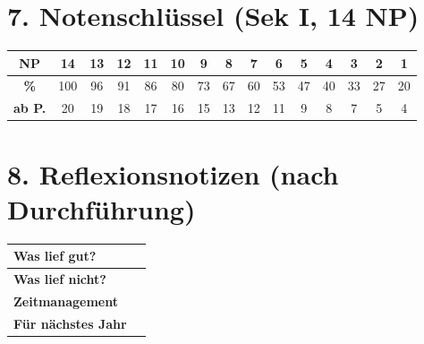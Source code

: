 \documentclass[11pt, a4paper]{article}
\begin{document}

\section*{7. Notenschlüssel (Sek I, 14 NP)}

\begin{tabular}{|c|c|c|c|c|c|c|c|c|c|c|c|c|c|c|}
\hline
\textbf{NP} & 14 & 13 & 12 & 11 & 10 & 9 & 8 & 7 & 6 & 5 & 4 & 3 & 2 & 1 \\
\hline
\textbf{\%} & 100 & 96 & 91 & 86 & 80 & 73 & 67 & 60 & 53 & 47 & 40 & 33 & 27 & 20 \\
\hline
\textbf{ab P.} & 20 & 19 & 18 & 17 & 16 & 15 & 13 & 12 & 11 & 9 & 8 & 7 & 5 & 4 \\
\hline
\end{tabular}


\section*{8. Reflexionsnotizen (nach Durchführung)}

\begin{tabularx}{\textwidth}{|l|X|}
\hline
\textbf{Was lief gut?} & \\[2em]
\hline
\textbf{Was lief nicht?} & \\[2em]
\hline
\textbf{Zeitmanagement} & \\[2em]
\hline
\textbf{Für nächstes Jahr} & \\[2em]
\hline
\end{tabularx}
\end{document}
